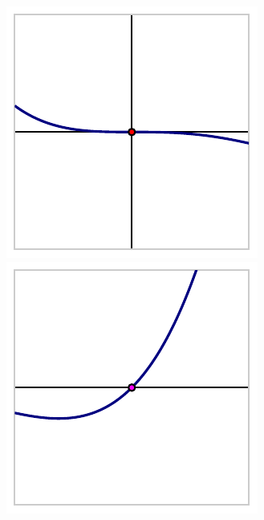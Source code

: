 \documentclass{ximera}
\begin{document}
\begin{image}
\includegraphics[width=1\linewidth]{images/polynomial-3-1-3.pdf}
\includegraphics[width=1\linewidth]{images/polynomial-3-1-1.pdf}
\end{image}
\end{document}
